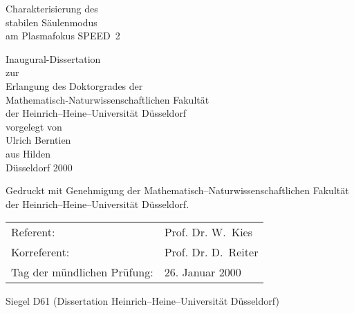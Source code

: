 %
%
\begin{titlepage}
  \begin{center}
    \vspace*{2cm}
    \begin{LARGE}
      {\sc Charakterisierung des\\
           stabilen Säulenmodus\\
           am Plasmafokus SPEED~2}\\
    \end{LARGE}
    \vspace*{6cm}
    Inaugural-Dissertation\\
    zur\\
    Erlangung des Doktorgrades der\\
    Mathematisch-Naturwissenschaftlichen Fakultät\\
    der Heinrich--Heine--Universität Düsseldorf\\
    \vspace*{4cm}
    vorgelegt von\\
    Ulrich Berntien\\
    aus Hilden\\
    \vfill
    Düsseldorf 2000\\
    \vspace*{2cm}
  \end{center}
\end{titlepage}
%
%
%
\thispagestyle{empty}
Gedruckt mit Genehmigung der
Mathematisch--Naturwissenschaftlichen \mbox{Fakultät} der
Heinrich--Heine--Universität Düsseldorf.
\par
\vspace*{5mm}
\begin{tabular}{ll}
  Referent:                 & Prof. Dr. W.~Kies
    \vspace*{5mm} \\
  Korreferent:              & Prof. Dr. D.~Reiter
    \vspace*{5mm} \\
  Tag der mündlichen Prüfung: & 26. Januar 2000\\
\end{tabular}
\vfill \noindent Siegel D61 (Dissertation
Heinrich--Heine--Universität Düsseldorf) \vspace*{5mm} \clearpage
